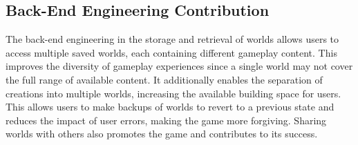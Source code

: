 \documentclass[14pt]{article}
\begin{document}
\subsection{Back-End Engineering Contribution}
The back-end engineering in the storage and retrieval of worlds allows users to access multiple saved worlds, each containing different gameplay content.
This improves the diversity of gameplay experiences since a single world may not cover the full range of available content.
It additionally enables the separation of creations into multiple worlds, increasing the available building space for users.
This allows users to make backups of worlds to revert to a previous state and reduces the impact of user errors, making the game more forgiving.
Sharing worlds with others also promotes the game and contributes to its success.
\end{document}
